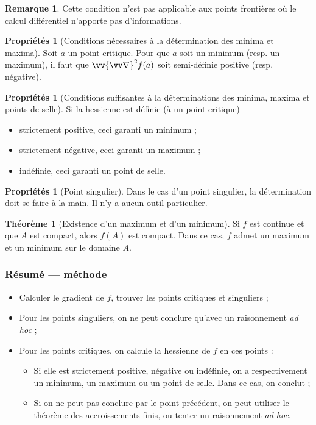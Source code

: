 \documentclass[11pt,a4paper]{article}
\theoremstyle{definition}
\newtheorem{myprop}[mydef]{Propriétés}
\newtheorem{myrem}[mydef]{Remarque}
\newtheorem{mytheo}[mydef]{Théorème}
\let\oldnabla\nabla
\renewcommand{\nabla}{\vv{\oldnabla}}
\begin{document}
\begin{myrem} Cette condition n'est pas applicable aux points frontières où le calcul différentiel n'apporte pas d'informations.\end{myrem}

\begin{myprop}[Conditions nécessaires à la détermination des minima et maxima]
Soit $a$ un point critique. Pour que $a$ soit un minimum (resp. un maximum), il faut que $\nabla^2 f(a)$ soit semi-définie positive (resp. négative).
\end{myprop}

\begin{myprop}[Conditions suffisantes à la déterminations des minima, maxima et points de selle]
Si la hessienne est définie (à un point critique)
\begin{itemize}
\item strictement positive, ceci garanti un minimum ;
\item strictement négative, ceci garanti un maximum ;
\item indéfinie, ceci garanti un point de selle.
\end{itemize}
\end{myprop}

\begin{myprop}[Point singulier] Dans le cas d'un point singulier, la détermination doit se faire à la main. Il n'y a aucun outil particulier. \end{myprop}

\begin{mytheo}[Existence d'un maximum et d'un minimum] Si $f$ est continue et que $A$ est compact, alors $f(A)$ est compact. Dans ce cas, $f$ admet un maximum et un minimum sur le domaine $A$. \end{mytheo}

\subsubsection{Résumé --- méthode}

\begin{itemize}
\item Calculer le gradient de $f$, trouver les points critiques et singuliers ;
\item Pour les points singuliers, on ne peut conclure qu'avec un raisonnement \emph{ad hoc} ;
\item Pour les points critiques, on calcule la hessienne de $f$ en ces points :
\begin{itemize}
\item Si elle est strictement positive, négative ou indéfinie, on a respectivement un minimum, un maximum ou un point de selle. Dans ce cas, on conclut ;
\item Si on ne peut pas conclure par le point précédent, on peut utiliser le théorème des accroissements finis, ou tenter un raisonnement \emph{ad hoc}.
\end{itemize}

\end{itemize}
\end{document}
